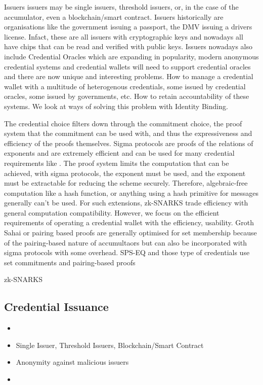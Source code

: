 Issuers
issuers may be single issuers, threshold issuers, or, in the case of the accumulator, even a blockchain/smart contract.
Issuers historically are organisations like the government issuing a passport, the DMV issuing a drivers license. Infact, these are all issuers with cryptographic keys and nowadays all have chips that can be read and verified with public keys. 
Issuers nowadays also include Credential Oracles which are expanding in popularity, modern anonymous credential systems and credential wallets will need to support credential oracles and there are now unique and interesting problems. How to manage a credential wallet with a multitude of heterogenous credentials, some issued by credential oracles, some issued by governments, etc. How to retain accountability of these systems. We look at ways of solving this problem with Identity Binding. 


The credential choice filters down through the commitment choice, the proof system that the commitment can be used with, and thus the expressiveness and efficiency of the proofs themselves. 
Sigma protocols are proofs of the relations of exponents and are extremely efficient and can be used for many credential requirements like . The proof system limits the computation that can be achieved, with sigma protocols, the exponent must be used, and the exponent must be extractable for reducing the scheme securely. Therefore, algebraic-free computation like a hash function, or anything using a hash primitive for messages generally can't be used. For such extensions, zk-SNARKS trade efficiency with general computation compatibility. However, we focus on the efficient requirements of operating a credential wallet with the efficiency, usability. 
Groth Sahai or pairing based proofs are generally optimised for set membership because of the pairing-based nature of accumultaors but can also be incorporated with sigma protocols with some overhead. SPS-EQ and those type of credentials use set commitments and pairing-based proofs 

zk-SNARKS 




\subsection{Credential Issuance}
\begin{itemize}
    \item 
    \item Single Issuer, Threshold Issuers, Blockchain/Smart Contract
    \item Anonymity against malicious issuers
    \item 
\end{itemize}


